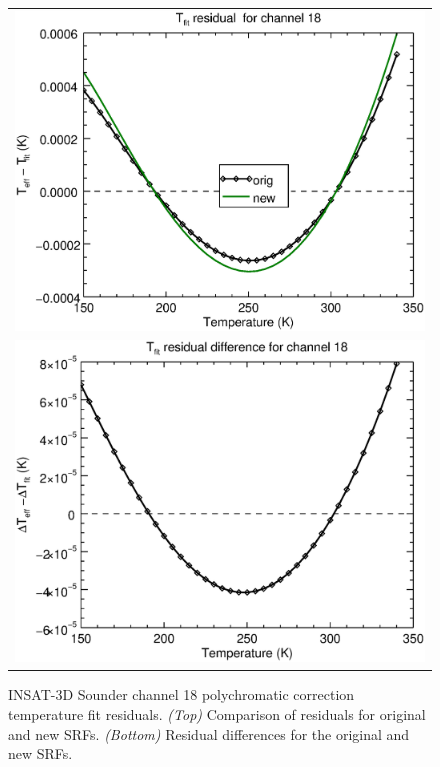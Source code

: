 \begin{figure}[H]
  \centering
  \begin{tabular}{c}
    \includegraphics[scale=0.55]{graphics/sndr/tfit/sndr_insat3d-18.tfit.eps} \\
    \includegraphics[scale=0.55]{graphics/sndr/tfit/sndr_insat3d-18.tfit.difference.eps}
  \end{tabular}
  \caption{INSAT-3D Sounder channel 18 polychromatic correction temperature fit residuals. \emph{(Top)} Comparison of residuals for original and new SRFs. \emph{(Bottom)} Residual differences for the original and new SRFs.}
  \label{fig:sndr_ch18_tfit}
\end{figure}



